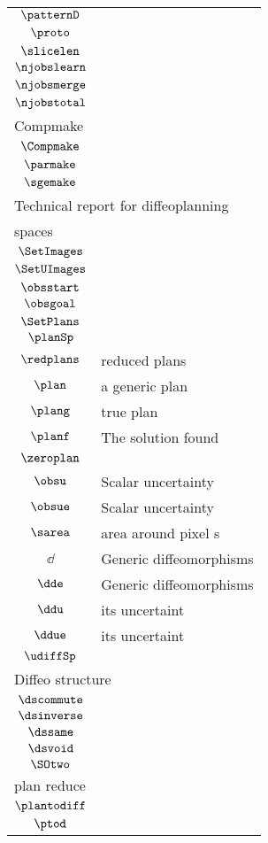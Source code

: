 \begin{longtable}{cl}
 $\patternD$ & \\ 
 $\proto$ & \\ 
 $\slicelen$ & \\ 
 $\njobslearn$ & \\ 
 $\njobsmerge$ & \\ 
 $\njobstotal$ & \\ 
 \multicolumn{2}{l}{Compmake}\\ 
 \hline
$\Compmake$ & \\ 
 $\parmake$ & \\ 
 $\sgemake$ & \\ 
 \multicolumn{2}{l}{Technical report for diffeoplanning}\\ 
 \hline
\multicolumn{2}{l}{spaces}\\ 
 \hline
$\SetImages$ & \\ 
 $\SetUImages$ & \\ 
 $\obsstart$ & \\ 
 $\obsgoal$ & \\ 
 $\SetPlans$ & \\ 
 $\planSp$ & \\ 
 $\redplans$ &  reduced plans\\ 
 $\plan$ &  a generic plan\\ 
 $\plang$ &  true plan\\ 
 $\planf$ &  The solution found \\ 
 $\zeroplan$ & \\ 
 $\obsu$ &  Scalar uncertainty\\ 
 $\obsue$ &  Scalar uncertainty\\ 
 $\sarea$ &  area around pixel s\\ 
 $\dd$ &  Generic diffeomorphisms\\ 
 $\dde$ &  Generic diffeomorphisms\\ 
 $\ddu$ &  its uncertaint\\ 
 $\ddue$ &  its uncertaint\\ 
 $\udiffSp$ & \\ 
 \multicolumn{2}{l}{Diffeo structure}\\ 
 \hline
$\dscommute$ & \\ 
 $\dsinverse$ & \\ 
 $\dssame$ & \\ 
 $\dsvoid$ & \\ 
 $\SOtwo$ & \\ 
 \multicolumn{2}{l}{plan reduce}\\ 
 \hline
$\plantodiff$ & \\ 
 $\ptod$ & \\ 

\end{longtable}
